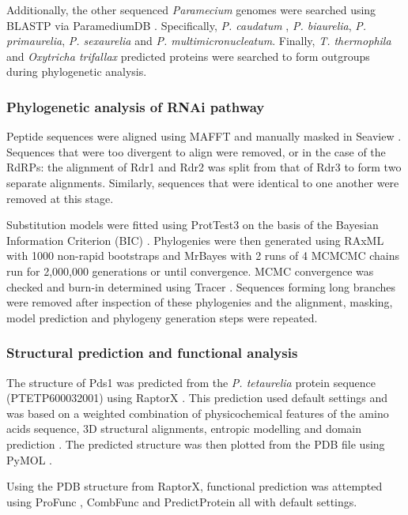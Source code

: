 Additionally, the other sequenced \textit{Paramecium} genomes 
were searched using BLASTP via ParamediumDB \citep{Arnaiz2007,Arnaiz2011a}.
Specifically, \textit{P. caudatum} \citep{McGrath2014}, 
\textit{P. biaurelia}, \textit{P. primaurelia}, \textit{P. sexaurelia}
and \textit{P. multimicronucleatum}. Finally,  \textit{T. thermophila} \citep{Eisen2006}
and \textit{Oxytricha trifallax} \citep{Swart2013}
predicted proteins were searched to form outgroups during phylogenetic
analysis.

\subsubsection{Phylogenetic analysis of RNAi pathway}

Peptide sequences were aligned using MAFFT \citep{Katoh2002} and manually
masked in Seaview \citep{Gouy2010}.
Sequences that were too divergent to align were removed, or in the case
of the RdRPs: the alignment of Rdr1 and Rdr2 was split from that of Rdr3 to form
two separate alignments.  Similarly, sequences that were identical
to one another were removed at this stage. 

Substitution models were fitted using ProtTest3 on the basis of the Bayesian
Information Criterion (BIC) \citep{Darriba2011c}.
Phylogenies were then generated using RAxML with 1000 non-rapid bootstraps and MrBayes 
with 2 runs of 4 MCMCMC chains run for 2,000,000 generations or until convergence.
MCMC convergence was checked and burn-in determined using Tracer \citep{rambaut2007tracer}.
Sequences forming long branches were removed after inspection of these phylogenies
and the alignment, masking, model prediction and phylogeny generation steps
were repeated.

\subsubsection{Structural prediction and functional analysis}

The structure of Pds1  
was predicted from the \textit{P. tetaurelia} protein sequence 
(PTETP600032001) using RaptorX \citep{Kallberg2012}.
This prediction used default settings and was based on
a weighted combination of 
physicochemical features of the amino acids sequence, 
3D structural alignments, entropic modelling
and domain prediction \citep{Kallberg2012}.
The predicted structure was then plotted from the PDB
file using PyMOL \citep{DeLano2002}.

Using the PDB structure from RaptorX, functional prediction
was attempted using ProFunc \citep{Laskowski2005},
CombFunc \citep{Wass2012} and PredictProtein \citep{Rost2004} all
with default settings.

